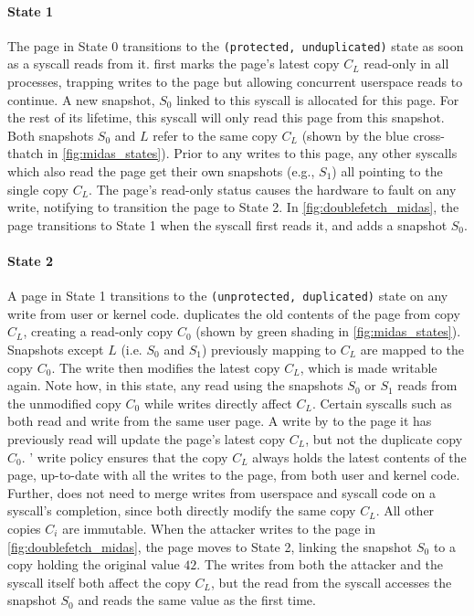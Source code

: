 \documentclass[letterpaper,twocolumn,10pt]{article}
\begin{document}
\paragraph{State 1}
The page in State 0 transitions to the \texttt{(protected, unduplicated)} state as soon as a syscall
reads from it.
\midas first marks the page's latest copy $C_L$ read-only in all processes,
trapping writes to the page but allowing concurrent userspace reads to continue.
A new snapshot, $S_0$ linked to this syscall is allocated for this page.
For the rest of its lifetime, this syscall will only read this page from this snapshot.
Both snapshots $S_0$ and $L$ refer to the same copy $C_L$ (shown by the
blue cross-thatch in \autoref{fig:midas_states}).
Prior to any writes to this page, any other syscalls which also read the page
get their own snapshots (e.g., $S_1$) all pointing to the single copy $C_L$.
The page's read-only status causes the hardware to fault on any write,
notifying \midas to transition the page to State 2.
In \autoref{fig:doublefetch_midas}, the page transitions to State 1 when
the syscall first reads it, and adds a snapshot $S_0$.

\paragraph{State 2}
A page in State 1 transitions to the \texttt{(unprotected, duplicated)} state
on any write from user or kernel code.
\midas duplicates the old contents of the page from copy $C_L$, creating a
read-only copy $C_0$ (shown by green shading in \autoref{fig:midas_states}).
Snapshots except $L$ (i.e. $S_0$ and $S_1$) previously mapping to $C_L$ are
mapped to the copy $C_0$.
The write then modifies the latest copy $C_L$, which is made writable again.
Note how, in this state, any read using the snapshots $S_0$ or $S_1$ reads
from the unmodified copy $C_0$ while writes directly affect $C_L$.
Certain syscalls such as  both read and write from
the same user page.
A write by  to the page it has previously read will update
the page's latest copy $C_L$, but not the duplicate copy $C_0$.
\midas' write policy ensures that the copy $C_L$ always holds the latest
contents of the page, up-to-date with all the writes to the page, from both user
and kernel code.
Further, \midas does not need to merge writes from userspace and syscall code
on a syscall's completion, since both directly modify the same copy $C_L$.
All other copies $C_i$ are immutable.
When the attacker writes to the page in \autoref{fig:doublefetch_midas}, the
page moves to State 2, linking the snapshot $S_0$ to a copy holding the
original value $42$.
The writes from both the attacker and the syscall itself both affect
the copy $C_L$, but the read from the syscall accesses the snapshot $S_0$
and reads the same value as the first time.
\end{document}
